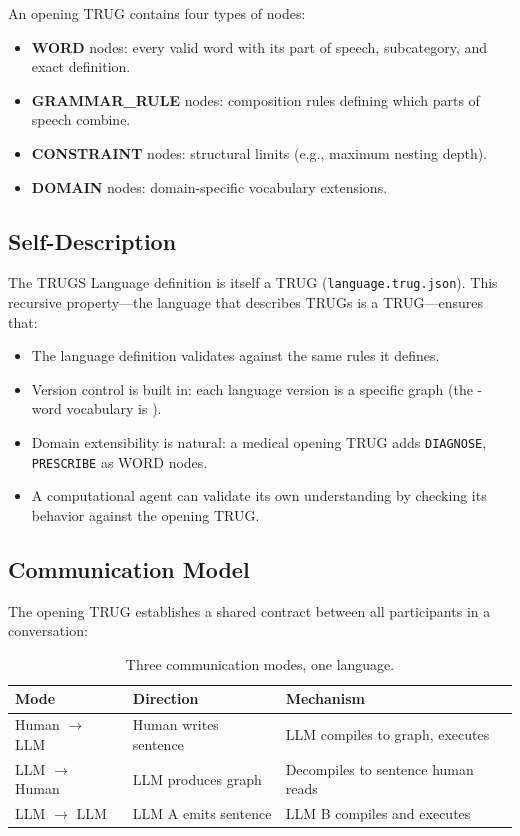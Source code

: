 \documentclass{article}
\begin{document}
An opening TRUG contains four types of nodes:

\begin{itemize}
    \item \textbf{WORD} nodes: every valid word with its part of speech, subcategory, and exact definition.
    \item \textbf{GRAMMAR\_RULE} nodes: composition rules defining which parts of speech combine.
    \item \textbf{CONSTRAINT} nodes: structural limits (e.g., maximum nesting depth).
    \item \textbf{DOMAIN} nodes: domain-specific vocabulary extensions.
\end{itemize}

\subsection{Self-Description}

The TRUGS Language definition is itself a TRUG (\texttt{language.trug.json}). This recursive property---the language that describes TRUGs is a TRUG---ensures that:

\begin{itemize}
    \item The language definition validates against the same rules it defines.
    \item Version control is built in: each language version is a specific graph (the \VocabTotal-word vocabulary is \texttt{\VocabVersion}).
    \item Domain extensibility is natural: a medical opening TRUG adds \texttt{DIAGNOSE}, \texttt{PRESCRIBE} as WORD nodes.
    \item A computational agent can validate its own understanding by checking its behavior against the opening TRUG.
\end{itemize}

\subsection{Communication Model}

The opening TRUG establishes a shared contract between all participants in a conversation:

\begin{table}[h]
\centering
\caption{Three communication modes, one language.}
\label{tab:comm}
\begin{tabular}{lll}
\toprule
\textbf{Mode} & \textbf{Direction} & \textbf{Mechanism} \\
\midrule
Human $\to$ LLM & Human writes sentence & LLM compiles to graph, executes \\
LLM $\to$ Human & LLM produces graph & Decompiles to sentence human reads \\
LLM $\to$ LLM & LLM A emits sentence & LLM B compiles and executes \\
\bottomrule
\end{tabular}
\end{table}
\end{document}
